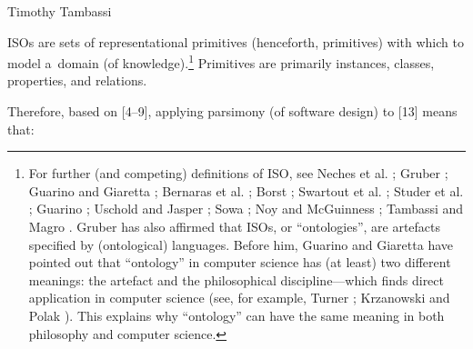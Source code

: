 \begin{artengenv}{Timothy Tambassi}
\begin{enumerate}[label={[\arabic*]}]
\item ISOs are sets of representational primitives (henceforth, primitives) with which to model a~domain (of knowledge).\footnote{For further (and competing) definitions of ISO, see Neches et al. 
\parencite*[][]{neches_enabling_1991}; %
 Gruber 
\parencite*[][]{gruber_translation_1993}; %
 Guarino and Giaretta 
\parencite*[][]{guarino_ontologies_1995}; %
 Bernaras et al. 
\parencite*[][]{bernaras_building_1996}; %
 Borst 
\parencite*[][]{borst_construction_1997}; %
 Swartout et al. 
\parencite*[][]{swartout_toward_1997}; %
 Studer et al. 
\parencite*[][]{studer_knowledge_1998}; %
 Guarino 
\parencite*[][]{guarino_formal_1998}; %
 Uschold and Jasper 
\parencite*[][]{uschold_framework_1999}; %
 Sowa 
\parencite*[][]{sowa_guided_2005}; %
 Noy and McGuinness 
\parencite*[][]{noy_ontology_2003}; %
 Tambassi and Magro 
\parencite*[][]{tambassi_ontologie_2015}. %
 Gruber 
\parencite*[][p.1964]{liu_ontology_2009} %
 has also affirmed that ISOs, or ``ontologies'', are artefacts specified by (ontological) languages. Before him, Guarino and Giaretta 
\parencite*[][]{guarino_ontologies_1995} %
 have pointed out that ``ontology'' in computer science has (at least) two different meanings: the artefact and the philosophical discipline---which finds direct application in computer science (see, for example, Turner 
\parencite*[][]{turner_computational_2018}; %
 Krzanowski and Polak 
\parencite*[][]{krzanowski_meta-ontology_2022}%
). This explains why ``ontology'' can have the same meaning in both philosophy and computer science. } Primitives are primarily instances, classes, properties, and relations.\footnotemark

\end{enumerate}

Therefore, based on [4–9], applying parsimony (of software design) to [13] means that:

\setcounter{saveenumtambassi}{\value{enumi}}

\begin{enumerate}[label={[\arabic*]}]


\end{enumerate}
\end{artengenv}
